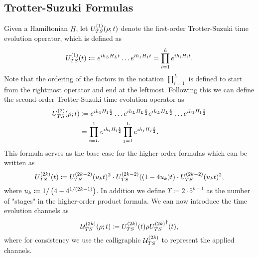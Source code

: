 \subsection{Trotter-Suzuki Formulas}
\begin{definition}\label{def:TS}
Given a Hamiltonian $H$, let ${U_{TS}^{( 1 )}}(\rho; t)$ denote the first-order Trotter-Suzuki time evolution operator, which is defined as 
\begin{equation}
    {U_{TS}^{( 1 )}}(t) \coloneqq e^{i h_L H_L t} \ldots e^{i h_1 H_1 t}  = \prod_{i = 1}^{L} e^{i h_i H_i t}.
\end{equation}
Note that the ordering of the factors in the notation $\prod_{i = 1}^L$ is defined to start from the rightmost operator and end at the leftmost. Following this we can define the second-order Trotter-Suzuki time evolution operator as
\begin{align}
    {U_{TS}^{( 2 )}}(\rho; t) &\coloneqq e^{i h_1 H_1 \frac{t}{2}} \ldots e^{i h_L H_L  \frac{t}{2}} e^{i h_L H_L  \frac{t}{2}} \ldots e^{i h_1 H_1 \frac{t}{2}} \\
    &= \prod_{i = L}^{1} e^{i h_i H_i \frac{t}{2}} \prod_{j = 1}^{L} e^{i h_j H_j \frac{t}{2}}.
\end{align}
This formula serves as the base case for the higher-order formulas which can be written as 
\begin{equation}
    {U_{TS}^{( 2k )}}(t) \coloneqq {U_{TS}^{( 2k-2 )}}(u_k t)^2 \cdot {U_{TS}^{( 2k-2 )}}((1-4 u_k)t) \cdot {U_{TS}^{( 2k-2 )}}(u_k t)^2,
\end{equation}
where $u_k \coloneqq 1 / \left( 4-4^{1/(2k - 1)} \right)$. In addition we define $\Upsilon \coloneqq 2 \cdot 5^{k-1}$ as the number of "stages" in the higher-order product formula. We can now introduce the time evolution channels as
\begin{equation}
    {\mathcal{U}_{TS}^{( 2k )}}(\rho; t)\coloneqq {U_{TS}^{( 2k )}}(t) \rho {U_{TS}^{( 2k )}}^\dagger(t),
\end{equation}
where for consistency we use the calligraphic ${\mathcal{U}_{TS}^{( 2k )}}$ to represent the applied channels.
\end{definition}

